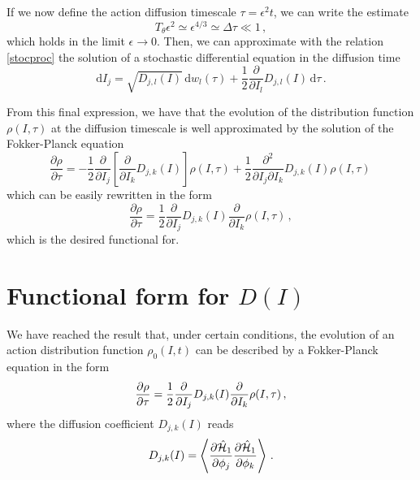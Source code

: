 If we now define the action diffusion timescale $\tau=\epsilon^2 t$, we can write the estimate 
\begin{equation}
    T_\theta \epsilon^2\simeq \epsilon^{4/3}\simeq \Delta \tau\ll 1 \,,
\end{equation}
which holds in the limit $\epsilon\to 0$. Then, we can approximate with the relation \eqref{stocproc} the solution of a stochastic differential equation in the diffusion time
\begin{equation}
    \mathrm{d}I_j=\sqrt{D_{j,l}(I)}\,\mathrm{d}w_l(\tau)+
    \frac{1}{2} \frac{\partial}{\partial I_l}D_{j,l}(I) \,\mathrm{d}\tau \,.
    \label{stocaction}
\end{equation}

From this final expression, we have that the evolution of the distribution function $\rho(I,\tau)$ at the diffusion timescale is well approximated by the solution of the Fokker-Planck equation
\begin{equation}
    \frac{\partial \rho}{\partial \tau}=- \frac{1}{2} \frac{\partial }{\partial I_j}
    \left [\frac{\partial}{\partial I_k}D_{j,k}(I) \right ]\rho(I,\tau)
    +\frac{1}{2}\frac{\partial^2}{\partial I_j\partial I_k}D_{j,k}(I)\rho(I,\tau)\,
\end{equation}
which can be easily rewritten in the form
\begin{equation}
    \frac{\partial \rho}{\partial \tau}=
    \frac{1}{2}\frac{\partial}{\partial I_j}D_{j,k}(I)
    \frac{\partial}{\partial I_k}\rho(I,\tau) \,,
    \label{fokker1}
\end{equation}
which is the desired functional for.

\section{Functional form for $D(I)$}

We have reached the result that, under certain conditions, the evolution of an action distribution function $\rho_0(I, t)$ can be described by a Fokker-Planck equation in the form
\begin{equation}
    \pdv{\rho}{\tau}=\frac{1}{2}\pdv{}{I_j} D_{j,k}(I) \pdv{}{I_k}\rho(I,\tau)\,,
    \label{eq:final-fp}
\end{equation} 
where the diffusion coefficient $D_{j,k}(I)$ reads
\begin{equation}
    D_{j,k}(I) = \left\langle\pdv{\hat{\mathcal{H}}_1}{\phi_j}\pdv{\hat{\mathcal{H}}_1}{\phi_k}\right\rangle \,.
\end{equation}

